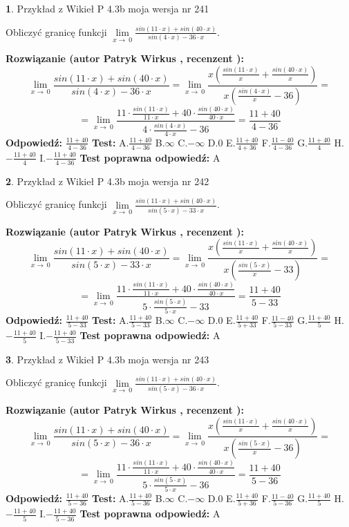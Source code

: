 \documentclass[12pt, a4paper]{article}
\theoremstyle{definition} %
\newtheorem{zad}{}
\newcommand{\zadStart}[1]{\begin{zad}#1\newline}
\newcommand{\zadStop}{\end{zad}}
\newcommand{\rozwStart}[2]{\noindent \textbf{Rozwiązanie (autor #1 , recenzent #2): }\newline}
\newcommand{\rozwStop}{\newline}
\newcommand{\odpStart}{\noindent \textbf{Odpowiedź:}\newline}
\newcommand{\odpStop}{\newline}
\newcommand{\testStart}{\noindent \textbf{Test:}\newline}
\newcommand{\testStop}{\newline}
\newcommand{\kluczStart}{\noindent \textbf{Test poprawna odpowiedź:}\newline}
\newcommand{\kluczStop}{\newline}
\begin{document}
\zadStart{Przykład z Wikieł P 4.3b moja wersja nr 241}


Obliczyć granicę funkcji $\lim\limits_{x\to\ 0}\frac{sin(11 \cdot x)+sin(40 \cdot x)}{sin(4 \cdot x)-36 \cdot x}$.
\zadStop
\rozwStart{Patryk Wirkus}{}
$$\lim\limits_{x\to\ 0}\frac{sin(11 \cdot x)+sin(40 \cdot x)}{sin(4 \cdot x)-36 \cdot x}=\lim\limits_{x\to\ 0}\frac{x(\frac{sin(11 \cdot x)}{x}+\frac{sin(40 \cdot x)}{x})}{x(\frac{sin(4 \cdot x)}{x}-36)}=$$
$$=\lim\limits_{x\to\ 0}\frac{11 \cdot \frac{sin(11 \cdot x)}{11 \cdot x}+40 \cdot \frac{sin(40 \cdot x)}{40 \cdot x}}{4 \cdot \frac{sin(4 \cdot x)}{4 \cdot x}-36}=\frac{11+40}{4-36}$$
\rozwStop
\odpStart
$\frac{11+40}{4-36}$
\odpStop
\testStart
A.$\frac{11+40}{4-36}$
B.$\infty$
C.$-\infty$
D.$0$
E.$\frac{11+40}{4+36}$
F.$\frac{11-40}{4-36}$
G.$\frac{11+40}{4}$
H.$-\frac{11+40}{4}$
I.$-\frac{11+40}{4-36}$
\testStop
\kluczStart
A
\kluczStop



\zadStart{Przykład z Wikieł P 4.3b moja wersja nr 242}


Obliczyć granicę funkcji $\lim\limits_{x\to\ 0}\frac{sin(11 \cdot x)+sin(40 \cdot x)}{sin(5 \cdot x)-33 \cdot x}$.
\zadStop
\rozwStart{Patryk Wirkus}{}
$$\lim\limits_{x\to\ 0}\frac{sin(11 \cdot x)+sin(40 \cdot x)}{sin(5 \cdot x)-33 \cdot x}=\lim\limits_{x\to\ 0}\frac{x(\frac{sin(11 \cdot x)}{x}+\frac{sin(40 \cdot x)}{x})}{x(\frac{sin(5 \cdot x)}{x}-33)}=$$
$$=\lim\limits_{x\to\ 0}\frac{11 \cdot \frac{sin(11 \cdot x)}{11 \cdot x}+40 \cdot \frac{sin(40 \cdot x)}{40 \cdot x}}{5 \cdot \frac{sin(5 \cdot x)}{5 \cdot x}-33}=\frac{11+40}{5-33}$$
\rozwStop
\odpStart
$\frac{11+40}{5-33}$
\odpStop
\testStart
A.$\frac{11+40}{5-33}$
B.$\infty$
C.$-\infty$
D.$0$
E.$\frac{11+40}{5+33}$
F.$\frac{11-40}{5-33}$
G.$\frac{11+40}{5}$
H.$-\frac{11+40}{5}$
I.$-\frac{11+40}{5-33}$
\testStop
\kluczStart
A
\kluczStop



\zadStart{Przykład z Wikieł P 4.3b moja wersja nr 243}


Obliczyć granicę funkcji $\lim\limits_{x\to\ 0}\frac{sin(11 \cdot x)+sin(40 \cdot x)}{sin(5 \cdot x)-36 \cdot x}$.
\zadStop
\rozwStart{Patryk Wirkus}{}
$$\lim\limits_{x\to\ 0}\frac{sin(11 \cdot x)+sin(40 \cdot x)}{sin(5 \cdot x)-36 \cdot x}=\lim\limits_{x\to\ 0}\frac{x(\frac{sin(11 \cdot x)}{x}+\frac{sin(40 \cdot x)}{x})}{x(\frac{sin(5 \cdot x)}{x}-36)}=$$
$$=\lim\limits_{x\to\ 0}\frac{11 \cdot \frac{sin(11 \cdot x)}{11 \cdot x}+40 \cdot \frac{sin(40 \cdot x)}{40 \cdot x}}{5 \cdot \frac{sin(5 \cdot x)}{5 \cdot x}-36}=\frac{11+40}{5-36}$$
\rozwStop
\odpStart
$\frac{11+40}{5-36}$
\odpStop
\testStart
A.$\frac{11+40}{5-36}$
B.$\infty$
C.$-\infty$
D.$0$
E.$\frac{11+40}{5+36}$
F.$\frac{11-40}{5-36}$
G.$\frac{11+40}{5}$
H.$-\frac{11+40}{5}$
I.$-\frac{11+40}{5-36}$
\testStop
\kluczStart
A
\kluczStop
\end{document}

